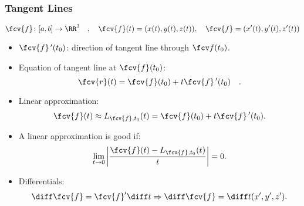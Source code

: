 \begin{frame}
\frametitle{Tangent Lines}
$$\fcv{f}\colon [a,b]\to \RR^3\quad , \quad \fcv{f}(t) = ( x(t), y(t), z(t)), \quad \fcv{f}=( x'(t), y'(t), z'(t)) $$
\begin{itemize}
\item $\fcv{f}\,'(t_0)$: direction of tangent line through $\fcv f(t_0)$.
\item<2-> Equation of tangent line at $\fcv{f}(t_0)$:
\[
\fcv{r}(t) = \fcv{f}(t_0) + t \fcv{f}\,'(t_0) \quad .
\]
\item<3-> Linear approximation:
\[
\fcv{f}(t) \approx L_{\fcv{f},t_0} (t) = \fcv{f}(t_0) + t \fcv{f}\,'(t_0).
\]
\item<4-> A linear approximation is good if:
\[
\lim_{t\to 0} \left|\frac{\fcv{f}(t) - L_{\fcv{f},t_0}(t)}{t} \right| =0.
\]
\item<5-> Differentials:
\[
\diff \fcv{f} = \fcv{f}' \diff t \Rightarrow \diff \fcv{f} = \diff  t ( x',y',z' ) .
\]
\end{itemize}
\end{frame}
